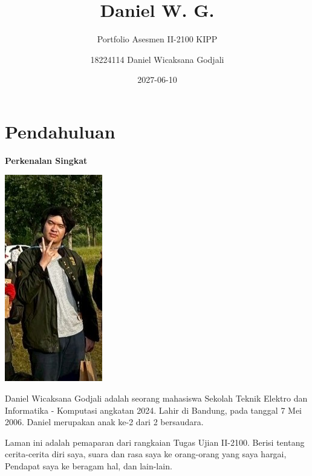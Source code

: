 \documentclass[
  letterpaper,
  DIV=11,
  numbers=noendperiod]{scrreprt}
\title{Daniel W. G.}
\subtitle{Portfolio Asesmen II-2100 KIPP}
\author{18224114 Daniel Wicaksana Godjali}
\date{2027-06-10}
\renewcommand*\contentsname{Table of contents}
\newcommand\contentsname{Table of contents}
\begin{document}
\maketitle

\renewcommand*\contentsname{Table of contents}
{
\hypersetup{linkcolor=}
\setcounter{tocdepth}{2}
\tableofcontents
}


\chapter*{Pendahuluan}\label{pendahuluan}


\textbf{Perkenalan Singkat}

\includegraphics[width=0.5\linewidth,height=\textheight,keepaspectratio]{images/LANTIK.jpg}

Daniel Wicaksana Godjali adalah seorang mahasiswa Sekolah Teknik Elektro
dan Informatika - Komputasi angkatan 2024. Lahir di Bandung, pada
tanggal 7 Mei 2006. Daniel merupakan anak ke-2 dari 2 bersaudara.

Laman ini adalah pemaparan dari rangkaian Tugas Ujian II-2100. Berisi
tentang cerita-cerita diri saya, suara dan rasa saya ke orang-orang yang
saya hargai, Pendapat saya ke beragam hal, dan lain-lain.
\end{document}
